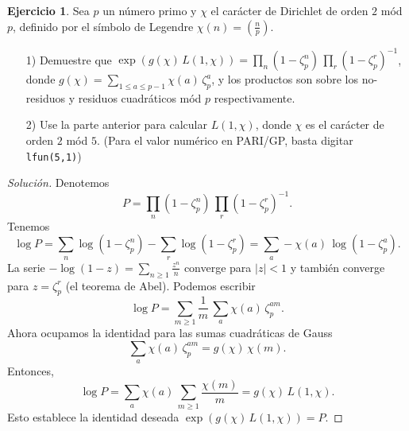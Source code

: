 \documentclass{article}
\newcounter{tarea}
\theoremstyle{definition}
\newtheorem{ejercicio}{Ejercicio}[tarea]
\newenvironment{solucion}{\begin{proof}[Solución]}{\end{proof}}
\newcommand{\legendre}[2]{\left(\frac{#1}{#2}\right)}
\begin{document}
\begin{ejercicio}
  Sea $p$ un número primo y $\chi$ el carácter de Dirichlet de orden $2$ mód
  $p$, definido por el símbolo de Legendre $\chi (n) = \legendre{n}{p}$.

  \begin{enumerate}
  \item[1)] Demuestre que
    $\exp (g (\chi)\,L (1,\chi)) = \prod_n (1 - \zeta_p^n)\,\prod_r (1 - \zeta_p^r)^{-1}$,
    donde $g (\chi) = \sum_{1 \le a \le p-1} \chi (a)\,\zeta_p^a$,
    y los productos son sobre los no-residuos y residuos cuadráticos mód $p$
    respectivamente.

  \item[2)] Use la parte anterior para calcular $L (1,\chi)$, donde $\chi$ es el
    carácter de orden $2$ mód $5$.
    (Para el valor numérico en PARI/GP, basta digitar \texttt{lfun(5,1)})
  \end{enumerate}

  \ifdefined\solutions
  \begin{solucion}
    Denotemos
    $$P = \prod_n (1 - \zeta_p^n) \, \prod_r (1 - \zeta_p^r)^{-1}.$$
    Tenemos
    $$\log P = \sum_n \log (1 - \zeta_p^n) - \sum_r \log (1 - \zeta_p^r) = \sum_a -\chi (a) \, \log (1 - \zeta_p^a).$$
    La serie $-\log (1-z) = \sum_{n\ge 1} \frac{z^n}{n}$ converge para $|z| < 1$
    y también converge para $z = \zeta_p^r$ (el teorema de Abel). Podemos
    escribir
    $$\log P = \sum_{m\ge 1} \frac{1}{m}\,\sum_a \chi (a)\,\zeta_p^{am}.$$
    Ahora ocupamos la identidad para las sumas cuadráticas de Gauss
    $$\sum_a \chi (a)\,\zeta_p^{am} = g (\chi)\,\chi (m).$$
    Entonces,
    $$\log P = \sum_a \chi (a)\,\sum_{m\ge 1} \frac{\chi (m)}{m} = g (\chi)\,L (1,\chi).$$
    Esto establece la identidad deseada $\exp (g (\chi)\,L (1,\chi)) = P$.


\end{solucion}
\end{ejercicio}
\end{document}
